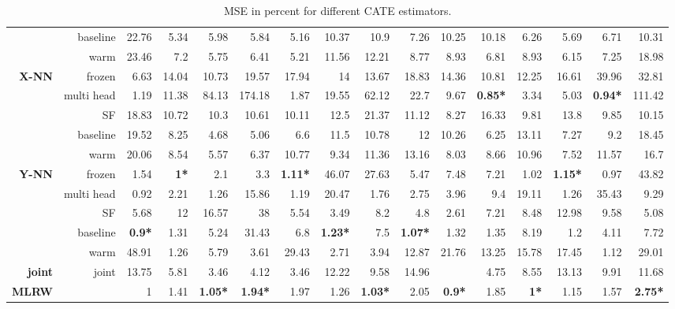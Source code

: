 \begin{table}
\begin{flushleft}
\begin{tabular}{rrrrrrrrrrrrrrrr}
   & baseline & 22.76 & 5.34 & 5.98 & 5.84 & 5.16 & 10.37 & 10.9 & 7.26 & 10.25 & 10.18 & 6.26 & 5.69 & 6.71 & 10.31 \\ 
   & warm & 23.46 & 7.2 & 5.75 & 6.41 & 5.21 & 11.56 & 12.21 & 8.77 & 8.93 & 6.81 & 8.93 & 6.15 & 7.25 & 18.98 \\ 
   \hline
{\textbf{X-NN}} & frozen & 6.63 & 14.04 & 10.73 & 19.57 & 17.94 & 14 & 13.67 & 18.83 & 14.36 & 10.81 & 12.25 & 16.61 & 39.96 & 32.81 \\ 
   & multi head & 1.19 & 11.38 & 84.13 & 174.18 & 1.87 & 19.55 & 62.12 & 22.7 & 9.67 & {\textbf{0.85*}} & 3.34 & 5.03 & {\textbf{0.94*}} & 111.42 \\ 
   & SF & 18.83 & 10.72 & 10.3 & 10.61 & 10.11 & 12.5 & 21.37 & 11.12 & 8.27 & 16.33 & 9.81 & 13.8 & 9.85 & 10.15 \\ 
   & baseline & 19.52 & 8.25 & 4.68 & 5.06 & 6.6 & 11.5 & 10.78 & 12 & 10.26 & 6.25 & 13.11 & 7.27 & 9.2 & 18.45 \\ 
   & warm & 20.06 & 8.54 & 5.57 & 6.37 & 10.77 & 9.34 & 11.36 & 13.16 & 8.03 & 8.66 & 10.96 & 7.52 & 11.57 & 16.7 \\ 
   \hline
{\textbf{Y-NN}} & frozen & 1.54 & {\textbf{1*}} & 2.1 & 3.3 & {\textbf{1.11*}} & 46.07 & 27.63 & 5.47 & 7.48 & 7.21 & 1.02 & {\textbf{1.15*}} & 0.97 & 43.82 \\ 
   & multi head & 0.92 & 2.21 & 1.26 & 15.86 & 1.19 & 20.47 & 1.76 & 2.75 & 3.96 & 9.4 & 19.11 & 1.26 & 35.43 & 9.29 \\ 
   & SF & 5.68 & 12 & 16.57 & 38 & 5.54 & 3.49 & 8.2 & 4.8 & 2.61 & 7.21 & 8.48 & 12.98 & 9.58 & 5.08 \\ 
   & baseline & {\textbf{0.9*}} & 1.31 & 5.24 & 31.43 & 6.8 & {\textbf{1.23*}} & 7.5 & {\textbf{1.07*}} & 1.32 & 1.35 & 8.19 & 1.2 & 4.11 & 7.72 \\ 
   & warm & 48.91 & 1.26 & 5.79 & 3.61 & 29.43 & 2.71 & 3.94 & 12.87 & 21.76 & 13.25 & 15.78 & 17.45 & 1.12 & 29.01 \\ 
   \hline
{\textbf{joint}} & joint & 13.75 & 5.81 & 3.46 & 4.12 & 3.46 & 12.22 & 9.58 & 14.96 &  & 4.75 & 8.55 & 13.13 & 9.91 & 11.68 \\ 
   \hline
{\textbf{MLRW}} &  & 1 & 1.41 & {\textbf{1.05*}} & {\textbf{1.94*}} & 1.97 & 1.26 & {\textbf{1.03*}} & 2.05 & {\textbf{0.9*}} & 1.85 & {\textbf{1*}} & 1.15 & 1.57 & {\textbf{2.75*}} \\ 
  \end{tabular}
\caption{MSE in percent for different CATE estimators.} 
\label{table:LM}
\end{flushleft}
\end{table}
